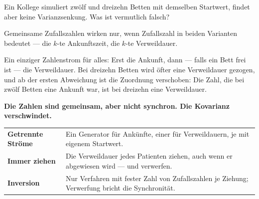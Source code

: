 \begin{aufgabe}
Ein Kollege simuliert zwölf und dreizehn Betten mit demselben Startwert, findet aber keine Varianzsenkung. Was ist vermutlich falsch?

\loesung
{}
Gemeinsame Zufallszahlen wirken nur, wenn  Zufallszahl in beiden Varianten  bedeutet --- die $k$-te Ankunftszeit, die $k$-te Verweildauer.

Ein einziger Zahlenstrom für alles: Erst die Ankunft, dann --- falls ein Bett frei ist --- die Verweildauer. Bei dreizehn Betten wird öfter eine Verweildauer gezogen, und ab der ersten Abweichung ist die Zuordnung verschoben: Die Zahl, die bei zwölf Betten eine Ankunft war, ist bei dreizehn eine Verweildauer.

\begin{center}
\begin{minipage}{0.9\textwidth}
\textbf{Die Zahlen sind gemeinsam, aber nicht synchron. Die Kovarianz verschwindet.}
\end{minipage}
\end{center}

\begin{center}
{\small
\renewcommand{\arraystretch}{1.5}
\begin{tabular}{@{}P{2.8cm}P{5.8cm}@{}}
\toprule
\textbf{Getrennte Ströme} & Ein Generator für Ankünfte, einer für Verweildauern, je mit eigenem Startwert.\\
\textbf{Immer ziehen} & Die Verweildauer jedes Patienten ziehen, auch wenn er abgewiesen wird --- und verwerfen.\\
\textbf{Inversion} & Nur Verfahren mit fester Zahl von Zufallszahlen je Ziehung; Verwerfung bricht die Synchronität.\\
\bottomrule
\end{tabular}}
\end{center}

\begin{center}
\begin{minipage}{0.88\textwidth}
\end{minipage}
\end{center}
\end{aufgabe}

